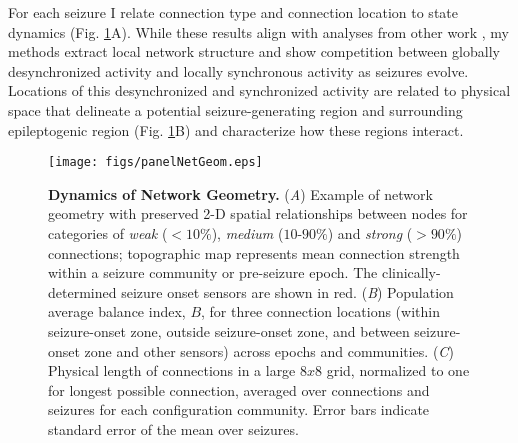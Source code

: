 For each seizure I relate connection type and connection location to state dynamics (Fig. \ref{fig:netgeom}A). While these results align with analyses from other work \cite{schindler2006assessing, schindler2008evolving, kramer2010coalescence, jiruska2012synchronization}, my methods extract local network structure and show competition between globally desynchronized activity and locally synchronous activity as seizures evolve. Locations of this desynchronized and synchronized activity are related to physical space that delineate a potential seizure-generating region and surrounding epileptogenic region (Fig. \ref{fig:netgeom}B) and characterize how these regions interact.

\begin{figure}
\centering
\texttt{[image: figs/panelNetGeom.eps]}
\caption[Dynamic network geometry]{\textbf{Dynamics of Network Geometry.} (\textit{A}) Example of network geometry with preserved 2-D spatial relationships between nodes for categories of \emph{weak} ($<10\%$), \emph{medium} ($10$-$90\%$) and \emph{strong} ($>90\%$) connections; topographic map represents mean connection strength within a seizure community or pre-seizure epoch. The clinically-determined seizure onset sensors are shown in red. (\textit{B}) Population average balance index, $B$, for three connection locations (within seizure-onset zone, outside seizure-onset zone, and between seizure-onset zone and other sensors) across epochs and communities. (\textit{C}) Physical length of connections in a large $8x8$ grid, normalized to one for longest possible connection, averaged over connections and seizures for each configuration community. Error bars indicate standard error of the mean over seizures.}
\label{fig:netgeom}
\end{figure}
